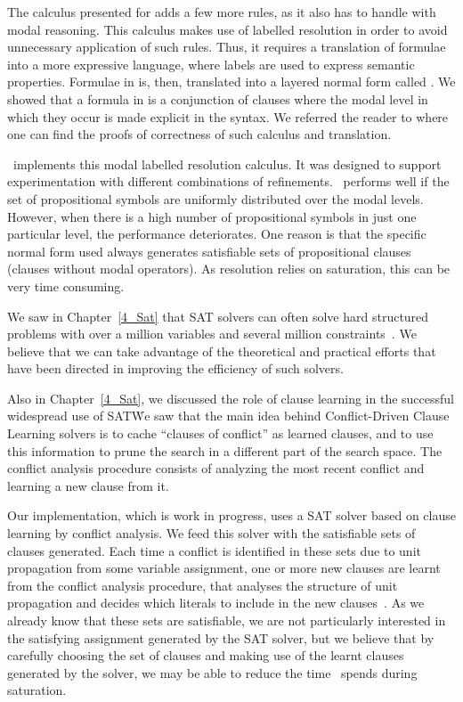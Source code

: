 The calculus presented for  adds a few more rules, as it also has
to handle with modal reasoning. This calculus makes use of labelled resolution
in order to avoid unnecessary application of such rules. Thus, it requires a
translation of formulae into a more expressive language, where labels are used
to express semantic properties. Formulae in  is, then, translated
into a layered normal form called . We showed that a formula in
 is a conjunction of clauses where the modal level in which they occur
is made explicit in the syntax. We referred the reader to where one can find the
proofs of correctness of such calculus and translation.

\ksp~implements this modal labelled resolution calculus. It was designed to
support experimentation with different combinations of refinements.
\ksp~performs well if the set of propositional symbols are uniformly distributed
over the modal levels. However, when there is a high number of propositional
symbols in just one particular level, the performance deteriorates. One reason
is that the specific normal form used always generates satisfiable sets of
propositional clauses (clauses without modal operators). As resolution relies on
saturation, this can be very time consuming. 

We saw in Chapter~\ref{4_Sat} that SAT solvers can often solve hard structured
problems with over a million variables and several million
constraints~\cite{satchapter}. We believe that we can take advantage of the
theoretical and practical efforts that have been directed in improving the
efficiency of such solvers. 

Also in Chapter~\ref{4_Sat}, we discussed the role of clause learning in the
successful widespread use of SAT\. We saw that the main idea behind
Conflict-Driven Clause Learning solvers is to cache ``clauses of conflict'' as
learned clauses, and to use this information to prune the search in a different
part of the search space. The conflict analysis procedure consists of analyzing
the most recent conflict and learning a new clause from it.

Our implementation, which is work in progress, uses a SAT solver based on clause
learning by conflict analysis. We feed this solver with the satisfiable sets of
clauses generated. Each time a conflict is identified in these sets due to unit
propagation from some variable assignment, one or more new clauses are learnt
from the conflict analysis procedure, that analyses the structure of unit
propagation and decides which literals to include in the new
clauses~\cite{cdclchapter}. As we already know that these sets are satisfiable,
we are not particularly interested in the satisfying assignment generated by the
SAT solver, but we believe that by carefully choosing the set of clauses and
making use of the learnt clauses generated by the solver, we may be able to
reduce the time \ksp~spends during saturation. 

